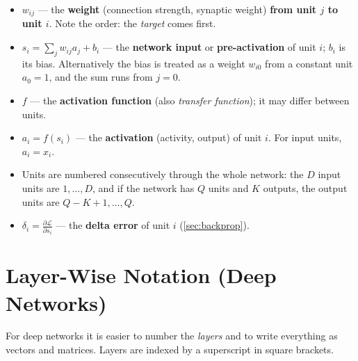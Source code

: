 \documentclass[11pt, oneside]{book}
\newcommand{\pd}[2]{\frac{\partial #1}{\partial #2}}
\newcommand{\loss}{\mathcal{L}}          %
\newcommand{\params}{\boldsymbol{\theta}}   %
\let\originalsection\section
\renewcommand{\section}{\Needspace{7\baselineskip}\originalsection}
\begin{document}
\begin{defbox}[title={Unit-wise notation (single neurons, MLPs)}]
\begin{itemize}
  \item $w_{ij}$ --- the \textbf{weight} (connection strength, synaptic
    weight) \textbf{from unit $j$ to unit $i$}. Note the order: the
    \emph{target} comes first.
  \item $s_i = \sum_j w_{ij} a_j + b_i$ --- the \textbf{network input} or
    \textbf{pre-activation} of unit $i$; $b_i$ is its bias. Alternatively the
    bias is treated as a weight $w_{i0}$ from a constant unit $a_0 = 1$, and
    the sum runs from $j = 0$.
  \item $f$ --- the \textbf{activation function} (also \emph{transfer
    function}); it may differ between units.
  \item $a_i = f(s_i)$ --- the \textbf{activation} (activity, output) of unit
    $i$. For input units, $a_i = x_i$.
  \item Units are numbered consecutively through the whole network: the $D$
    input units are $1, \dots, D$, and if the network has $Q$ units and $K$
    outputs, the output units are $Q - K + 1, \dots, Q$.
  \item $\delta_i = \pd{\loss}{s_i}$ --- the \textbf{delta error} of unit $i$
    (\cref{sec:backprop}).
\end{itemize}
\end{defbox}

\section{Layer-Wise Notation (Deep Networks)}
\label{sec:notation-layers}

For deep networks it is easier to number the \emph{layers} and to write
everything as vectors and matrices. Layers are indexed by a superscript in
square brackets.
\end{document}
